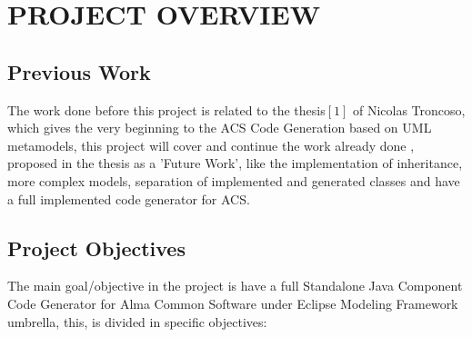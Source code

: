 \section{PROJECT OVERVIEW}
\subsection{Previous Work}
The work done before this project is related to the thesis$[1]$ of Nicolas
Troncoso, which gives the very beginning to the ACS Code Generation based on UML
metamodels, this project will cover and continue the work already done
, proposed in the thesis as a 'Future Work', like the implementation of
inheritance, more complex models, separation of implemented and generated
classes and have a full implemented code generator for ACS.

\subsection{Project Objectives}
The main goal/objective in the project is have a full Standalone Java Component
Code Generator for Alma Common Software under Eclipse Modeling Framework
umbrella, this, is divided in specific objectives:

